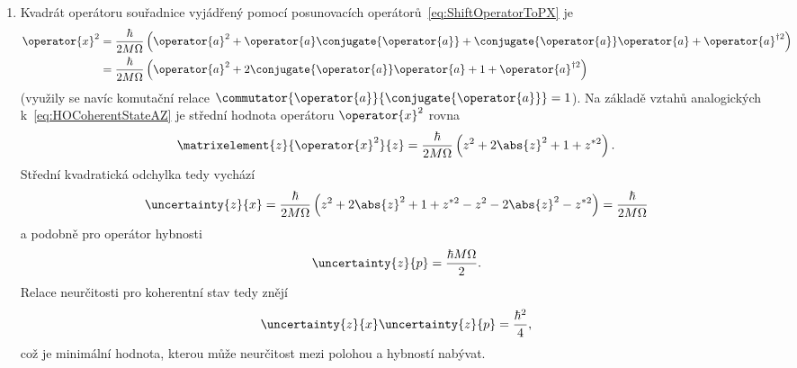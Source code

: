 \begin{solution}
\begin{enumerate}
		\begin{note}
			Ze srovnání výsledků tohoto bodu se vztahy~\eqref{eq:HOCoherentStateFromPositionMomentum} a~\eqref{eq:HOCoherentStateab} vyplývá, že koherentní stav $\ket{z}$ lze interpretovat (až na fázi) jako základní stav harmonického oscilátoru posunutého v souřadnici o $a=\mean{\operator{x}}_{z}$ a v hybnosti o $b=\mean{\operator{p}}_{z}$. V $x$-reprezentaci ho lze vyjádřit jako posunutou Gaussovskou funkci~\eqref{eq:HOWaveFunctionGroundState}.
		\end{note}

	\item
		Kvadrát operátoru souřadnice vyjádřený pomocí posunovacích operátorů~\eqref{eq:ShiftOperatorToPX} je
		\begin{align}
			\operator{x}^{2}
				&=\frac{\hbar}{2M\Omega}\left(\operator{a}^{2}+\operator{a}\conjugate{\operator{a}}+\conjugate{\operator{a}}\operator{a}+\operator{a}^{\dagger 2}\right)
					\nonumber\\
				&=\frac{\hbar}{2M\Omega}\left(\operator{a}^{2}+2\conjugate{\operator{a}}\operator{a}+1+\operator{a}^{\dagger 2}\right)
		\end{align}
		(využily se navíc komutační relace $\commutator{\operator{a}}{\conjugate{\operator{a}}}=1$).
		Na základě vztahů analogických k~\eqref{eq:HOCoherentStateAZ} je střední hodnota operátoru $\operator{x}^{2}$ rovna
		\begin{equation}
			\matrixelement{z}{\operator{x}^{2}}{z}=\frac{\hbar}{2M\Omega}\left(z^{2}+2\abs{z}^{2}+1+z^{*2}\right).
		\end{equation}
		Střední kvadratická odchylka tedy vychází
		\begin{equation}
			\uncertainty{z}{x}
				=\frac{\hbar}{2M\Omega}
					\left(z^{2}+2\abs{z}^{2}+1+z^{*2}-z^{2}-2\abs{z}^{2}-z^{*2}\right)
				=\frac{\hbar}{2M\Omega}
		\end{equation}
		a podobně pro operátor hybnosti
		\begin{equation}
			\uncertainty{z}{p}=\frac{\hbar M\Omega}{2}.
		\end{equation}
		Relace neurčitosti pro koherentní stav tedy znějí
		\begin{equation}
			\label{eq:HOCoherentStateUncertainty}
			\uncertainty{z}{x}\uncertainty{z}{p}=\frac{\hbar^{2}}{4},
		\end{equation}
		což je minimální hodnota, kterou může neurčitost mezi polohou a hybností nabývat.
	\end{enumerate}
\end{solution}
